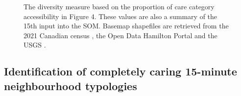 \documentclass[
  authoryear,
  preprint,
  3p]{elsarticle}
\begin{document}
\begin{figure}


\caption{\label{fig-Fig5}The diversity measure based on the proportion
of care category accessibility in Figure 4. These values are also a
summary of the 15th input into the SOM. Basemap shapefiles are retrieved
from the 2021 Canadian census
\citep{governmentofcanadaCensusPopulation2023}, the Open Data Hamilton
Portal \citep{opendatahamiltonCityBoundary2023} and the USGS
\citep{greatlakesUSGS2010}.}

\end{figure}%

\newpage

\subsection{Identification of completely caring 15-minute neighbourhood
typologies}\label{identification-of-completely-caring-15-minute-neighbourhood-typologies}
\end{document}
